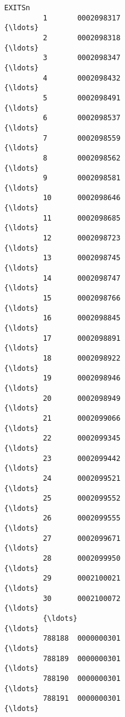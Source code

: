 \documentclass[11pt]{article}
\begin{document}
\begin{Verbatim}[commandchars=\\\{\}]
                                                            EXITSn  
         1       0002098317                                    {\ldots}  
         2       0002098318                                    {\ldots}  
         3       0002098347                                    {\ldots}  
         4       0002098432                                    {\ldots}  
         5       0002098491                                    {\ldots}  
         6       0002098537                                    {\ldots}  
         7       0002098559                                    {\ldots}  
         8       0002098562                                    {\ldots}  
         9       0002098581                                    {\ldots}  
         10      0002098646                                    {\ldots}  
         11      0002098685                                    {\ldots}  
         12      0002098723                                    {\ldots}  
         13      0002098745                                    {\ldots}  
         14      0002098747                                    {\ldots}  
         15      0002098766                                    {\ldots}  
         16      0002098845                                    {\ldots}  
         17      0002098891                                    {\ldots}  
         18      0002098922                                    {\ldots}  
         19      0002098946                                    {\ldots}  
         20      0002098949                                    {\ldots}  
         21      0002099066                                    {\ldots}  
         22      0002099345                                    {\ldots}  
         23      0002099442                                    {\ldots}  
         24      0002099521                                    {\ldots}  
         25      0002099552                                    {\ldots}  
         26      0002099555                                    {\ldots}  
         27      0002099671                                    {\ldots}  
         28      0002099950                                    {\ldots}  
         29      0002100021                                    {\ldots}  
         30      0002100072                                    {\ldots}  
         {\ldots}                                                   {\ldots}  
         788188  0000000301                                    {\ldots}  
         788189  0000000301                                    {\ldots}  
         788190  0000000301                                    {\ldots}  
         788191  0000000301                                    {\ldots}  

\end{Verbatim}
\end{document}
